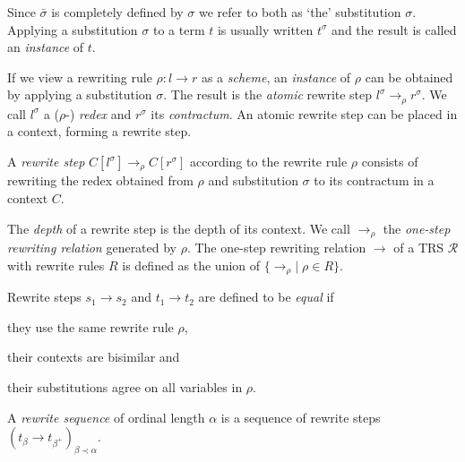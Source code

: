 Since $\bar{\sigma}$ is completely defined by $\sigma$ we refer to both as
`the' substitution $\sigma$.
Applying a substitution $\sigma$ to a term $t$ is usually written
$t^\sigma$ and the result is called an \emph{instance} of $t$.

If we view a rewriting rule $\rho : l \rightarrow r$ as a \emph{scheme}, an
\emph{instance} of $\rho$ can be obtained by applying a substitution
$\sigma$. The result is the \emph{atomic} rewrite step $l^\sigma
\rightarrow_\rho r^\sigma$. We call $l^\sigma$ a ($\rho$-) \emph{redex} and
$r^\sigma$ its \emph{contractum}. An atomic rewrite step can be placed in a
context, forming a rewrite step.

\begin{definition}%
A \emph{rewrite step} $C[l^\sigma] \rightarrow_\rho C[r^\sigma]$ according to
the rewrite rule $\rho$ consists of rewriting the redex obtained from
$\rho$ and substitution $\sigma$ to its contractum in a context $C$.
\end{definition}

The \emph{depth} of a rewrite step is the depth of its context. We
call $\rightarrow_\rho$ the \emph{one-step rewriting relation}
generated by $\rho$. The one-step rewriting relation $\rightarrow$ of
a TRS $\mathcal{R}$ with rewrite rules $R$ is defined as the union of
$\{ \rightarrow_\rho | \; \rho \in R \}$.

\begin{definition}\label{def:stepeq}%
Rewrite steps $s_1 \rightarrow s_2$ and $t_1 \rightarrow t_2$ are
defined to be \emph{equal} if
\begin{compactenum}
  \item they use the same rewrite rule $\rho$,
  \item their contexts are bisimilar and
  \item their substitutions agree on all variables in $\rho$.
\end{compactenum}
\end{definition}

\begin{definition}%
A \emph{rewrite sequence} of ordinal length $\alpha$ is a sequence of rewrite
steps $(t_\beta \rightarrow t_{\beta^+})_{\beta \prec \alpha}$.
\end{definition}

